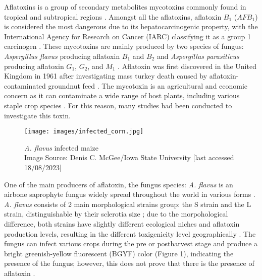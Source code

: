 Aflatoxins is a group of secondary metabolites mycotoxins commonly found in tropical and subtropical regions . Amongst all the aflatoxins, aflatoxin $B_{1}$ ($AFB_{1}$) is considered the most dangerous due to its hepatocarcinogenic property, \citep{gizachew2019aflatoxin} with the International Agency for Research on Cancer (IARC) classifying it as a group 1 carcinogen \citep{international2012review}. These mycotoxins are mainly produced by two species of fungus: \textit{Aspergillus flavus} producing aflatoxin $B_{1}$ and $B_{2}$ and \textit{Aspergillus parasiticus} producing aflatoxin $G_{1}$, $G_{2}$, and $M_{1}$ \citep{10.1079/cabicompendium.7432}. Aflatoxin was first discovered in the United Kingdom in 1961 after investigating mass turkey death caused by aflatoxin-contaminated groundnut feed \citep{aflatoxins1979other}. The mycotoxin is an agricultural and economic \citep{wu2015global} concern as it can contaminate a wide range of host plants, including various staple crop species \citep{10.1079/cabicompendium.7432}. For this reason, many studies \citep{chauhan2015improved} \citep{bernaldez2017influence}  had been conducted to investigate this toxin.

\begin{figure*}[!ht]
    \centering
    \begin{minipage}{10cm}
        \centering
        \texttt{[image: images/infected\_corn.jpg]}
        \caption{\textit{A. flavus} infected maize \\ Image Source: Denis C. McGee/Iowa State University \citep{10.1079/cabicompendium.7432} [last accessed 18/08/2023]}
        \label{fig:aflavus-infected-maize}
    \end{minipage}
\end{figure*}

One of the main producers of aflatoxin, the fungus species: \textit{A. flavus} is an airbone saprophyte fungus \citep{goldblatt2012aflatoxin} widely spread throughout the world in various forms \citep{diener1987epidemiology}. \textit{A. flavus} consists of 2 main morphological strains group: the S strain and the L strain, distinguishable by their sclerotia size \citep{amaike2011aspergillus}; due to the morpohological difference, both strains have slightly different ecological niches and aflatoxin production levels, resulting in the different toxigenicity level geographically \citep{10.1079/cabicompendium.7432}. The fungus can infect various crops during the pre or postharvest stage and produce a bright greenish-yellow fluorescent (BGYF) color (Figure 1), indicating the presence of the fungus; however, this does not prove that there is the presence of aflatoxin \citep{yao2006hyperspectral}. \vspace{\baselineskip} 

